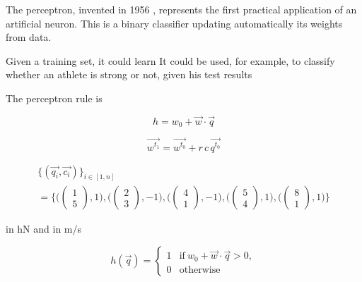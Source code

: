 The perceptron, invented in 1956 \cite{Rosenblatt1958}, represents the first practical application of an artificial neuron. This is a binary classifier updating automatically its weights from data. 



Given a training set, it could learn
It could be used, for example, to classify whether an athlete is strong or not, given his test results 

The perceptron rule is 


\begin{equation} 
      h = w_0 + \overrightarrow{w} \cdot \overrightarrow{q} 
\end{equation}
      
\begin{equation} 
      \overrightarrow{w^{t_1}} = \overrightarrow{w^{t_0}} + r\, c\, \overrightarrow{q^{t_0}} 
\end{equation}
      
\begin{multline}
      \biggl\{(\overrightarrow{q_i}, \overrightarrow{c_i})\biggr\}_{i\in [1,n]} \\
      = \Biggl\{ 
      \biggl( \begin{pmatrix} 1 \\ 5 \end{pmatrix}, 1 \biggr),
      \biggl( \begin{pmatrix} 2 \\ 3 \end{pmatrix}, -1 \biggr),
      \biggl( \begin{pmatrix} 4 \\ 1 \end{pmatrix}, -1 \biggr),
      \biggl( \begin{pmatrix} 5 \\ 4 \end{pmatrix}, 1 \biggr),
      \biggl( \begin{pmatrix} 8 \\ 1 \end{pmatrix}, 1 \biggr)
      \Biggr\}
\end{multline}
      
      
in hN and in m/s
      
\begin{equation}
      h(\overrightarrow{q}) = 
      \begin{cases}
      1 & \text{if} \ w_0 + \overrightarrow{w} \cdot \overrightarrow{q} > 0,\\
      0 & \text{otherwise}
      \end{cases}
\end{equation}


